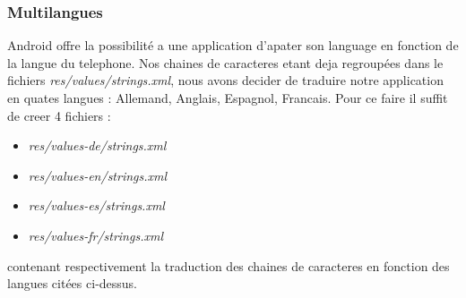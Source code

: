 \subsubsection{Multilangues}
Android offre la possibilité a une application d'apater son language en fonction
de la langue du telephone. Nos chaines de caracteres etant deja regroupées dans
le fichiers \textit{res/values/strings.xml}, nous avons decider de traduire
notre application en quates langues : Allemand, Anglais, Espagnol, Francais.\newline
Pour ce faire il suffit de creer 4 fichiers :
\begin{itemize}
\item \textit{res/values-de/strings.xml}
\item \textit{res/values-en/strings.xml}
\item \textit{res/values-es/strings.xml}
\item \textit{res/values-fr/strings.xml}
\end{itemize}
contenant respectivement la traduction des chaines de caracteres en fonction des
langues citées ci-dessus.
